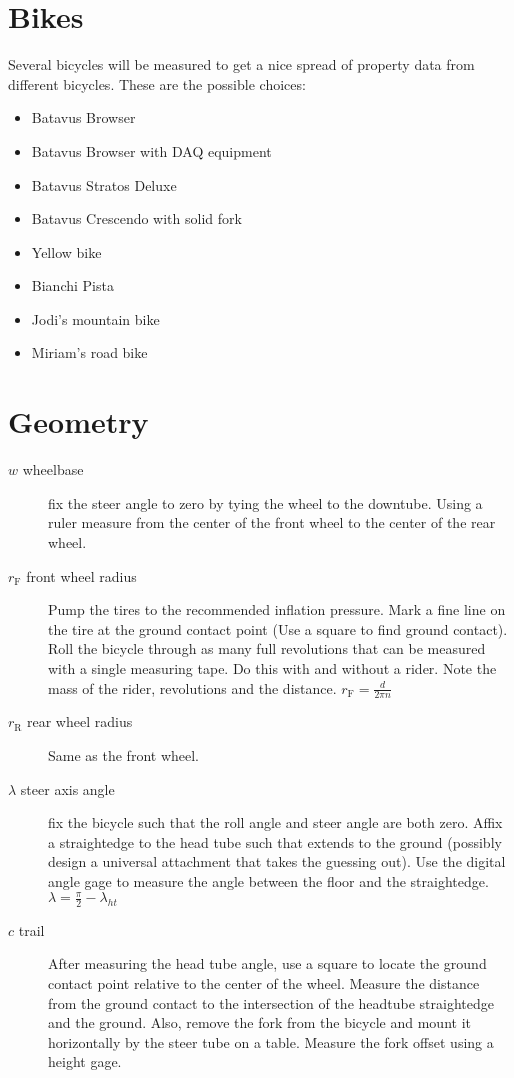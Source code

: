 \documentclass{article}
\begin{document}
\section{Bikes}
Several bicycles will be measured to get a nice spread of property data from different bicycles. These are the possible choices:
\begin{itemize}
	\item Batavus Browser
	\item Batavus Browser with DAQ equipment
	\item Batavus Stratos Deluxe
	\item Batavus Crescendo with solid fork
	\item Yellow bike
	\item Bianchi Pista
	\item Jodi's mountain bike
	\item Miriam's road bike
\end{itemize}

\section{Geometry}
\begin{description}
	\item[$w$ wheelbase] fix the steer angle to zero by tying the wheel to the downtube. Using a ruler measure from the center of the front wheel to the center of the rear wheel.
	\item[$r_\mathrm{F}$ front wheel radius] Pump the tires to the recommended inflation pressure. Mark a fine line on the tire at the ground contact point (Use a square to find ground contact). Roll the bicycle through as many full revolutions that can be measured with a single measuring tape. Do this with and without a rider. Note the mass of the rider, revolutions and the distance. $r_\mathrm{F}=\frac{d}{2\pi n}$
	\item[$r_\mathrm{R}$ rear wheel radius] Same as the front wheel.
	\item[$\lambda$ steer axis angle] fix the bicycle such that the roll angle and steer angle are both zero. Affix a straightedge to the head tube such that extends to the ground (possibly design a universal attachment that takes the guessing out). Use the digital angle gage to measure the angle between the floor and the straightedge. $\lambda=\frac{\pi}{2}-\lambda_{ht}$
	\item[$c$ trail] After measuring the head tube angle, use a square to locate the ground contact point relative to the center of the wheel. Measure the distance from the ground contact to the intersection of the headtube straightedge and the ground. Also, remove the fork from the bicycle and mount it horizontally by the steer tube on a table. Measure the fork offset using a height gage.
\end{description}
\end{document}
